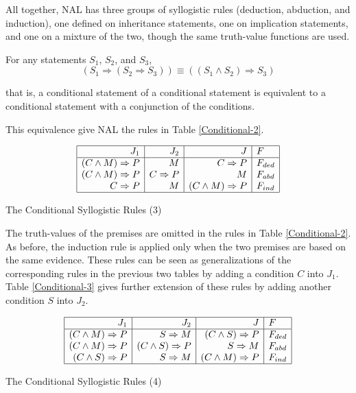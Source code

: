 All together, NAL has three groups of syllogistic rules (deduction, abduction, and induction), one defined on inheritance statements, one on implication statements, and one on a mixture of the two, though the same truth-value functions are used.

\begin{theo}
For any statements $S_1$, $S_2$, and $S_3$,
\[(S_1 \Rightarrow (S_2 \Rightarrow S_3)) \equiv ((S_1 \wedge S_2) \Rightarrow S_3)\]
\end{theo}
that is, a conditional statement of a conditional statement is equivalent to a conditional statement with a conjunction of the conditions. 

This equivalence give NAL the rules in Table \ref{Conditional-2}.

\begin{table}[htb]
\[\begin{array}{|r|r|r|l|} \hline
J_1 & J_2 & J & F \\ 
\hline
(C \wedge M) \Rightarrow P & M & C \Rightarrow P & F_{ded} \\
(C \wedge M) \Rightarrow P & C \Rightarrow P & M & F_{abd} \\
C \Rightarrow P & M & (C \wedge M) \Rightarrow P & F_{ind} \\
\hline \end{array}\]
\caption{The Conditional Syllogistic Rules (3)}
\label{Conditional-2}
\end{table}

The truth-values of the premises are omitted in the rules in Table \ref{Conditional-2}. As before, the induction rule is applied only when the two premises are based on the same evidence. These rules can be seen as generalizations of the corresponding rules in the previous two tables by adding a condition $C$ into $J_1$. Table \ref{Conditional-3} gives further extension of these rules by adding another condition $S$ into $J_2$.

\begin{table}[htb]
\[\begin{array}{|r|r|r|l|} \hline
J_1 & J_2 & J & F \\
\hline
(C \wedge M) \Rightarrow P & S \Rightarrow M & (C \wedge S) \Rightarrow P & F_{ded} \\
(C \wedge M) \Rightarrow P & (C \wedge S) \Rightarrow P & S \Rightarrow M & F_{abd} \\
(C \wedge S) \Rightarrow P & S \Rightarrow M & (C \wedge M) \Rightarrow P & F_{ind} \\
\hline \end{array}\]
\caption{The Conditional Syllogistic Rules (4)}
\label{Conditional-3}
\end{table}

